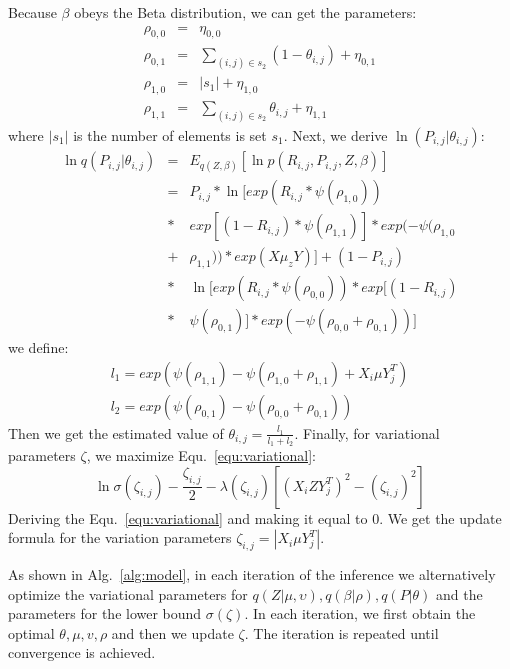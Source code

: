 \documentclass[journal]{IEEEtran}
\begin{document}
Because $\beta$ obeys the Beta distribution, we can get the parameters: 
\begin{eqnarray*}
\rho_{0,0} &=& \eta_{0,0}\\
\rho_{0,1} &=& \sum_{(i,j)\in s_2}(1-\theta_{i,j})+\eta_{0,1}\\
\rho_{1,0} &=& \left|s_1\right| +\eta_{1,0}\\
\rho_{1,1} &=& \sum_{(i,j)\in s_2}\theta_{i,j}+\eta_{1,1}
\end{eqnarray*}
where $\left|s_1\right|$ is the number of elements is set $s_1$. Next, we derive $\ln(P_{i,j}|\theta_{i,j})$:
\begin{eqnarray*}
\ln q(P_{i,j}|\theta_{i,j}) &=& E_{q(Z,\beta)}[\ln p(R_{i,j},P_{i,j},Z,\beta)] \\
&=& P_{i,j}*\ln[exp(R_{i,j}*\psi(\rho_{1,0}))\\
&*&exp[(1-R_{i,j})*\psi(\rho_{1,1})]*exp(-\psi(\rho_{1,0}\\
&+&\rho_{1,1}))*exp(X\mu_{z}Y)]+(1-P_{i,j}) \\
&*&\ln[exp(R_{i,j}*\psi(\rho_{0,0}))*exp[(1-R_{i,j})\\
&*&\psi(\rho_{0,1})]*exp(-\psi(\rho_{0,0}+\rho_{0,1}))]
\end{eqnarray*}
we define:
\begin{eqnarray*}
l_1 = exp(\psi(\rho_{1,1})-\psi(\rho_{1,0}+\rho_{1,1})+X_{i}\mu Y_{j}^{T})\\
l_2 = exp(\psi(\rho_{0,1})-\psi(\rho_{0,0}+\rho_{0,1}))
\end{eqnarray*}
Then we get the estimated value of $\theta_{i,j}=\frac{l_1}{l_1+l_2}$.
Finally, for variational parameters $\zeta$, we maximize Equ.~\ref{equ:variational}:
\begin{equation}\label{equ:variational}
    \ln{\sigma(\zeta_{i,j})}-\frac{\zeta_{i,j}}{2}-\lambda(\zeta_{i,j})[(X_{i}ZY_{j}^{T})^2-(\zeta_{i,j})^2]
\end{equation}
Deriving the Equ.~\ref{equ:variational} and making it equal to $0$. We get the update formula for the variation parameters $\zeta_{i,j} = \left|X_{i}\mu Y_{j}^T\right|$.

As shown in Alg.~\ref{alg:model}, in each iteration of the inference we alternatively optimize the variational parameters for $q(Z|\mu,\upsilon),q(\beta|\rho), q(P|\theta)$ and the parameters for the lower bound $\sigma(\zeta)$.  In each iteration, we first obtain the optimal $\theta,\mu,v,\rho$ and then we update $\zeta$. The iteration is repeated until convergence is achieved.
\end{document}
